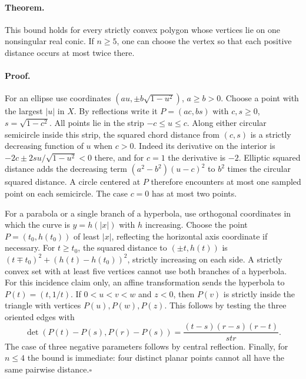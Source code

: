 \documentclass[11pt]{article}
\begin{document}
\paragraph{Theorem.}
This bound holds for every strictly convex polygon whose vertices lie on one nonsingular real conic. If $n\ge5$, one can choose the vertex so that each positive distance occurs at most twice there.
\paragraph{Proof.}
For an ellipse use coordinates $(au,\pm b\sqrt{1-u^2})$, $a\ge b>0$. Choose a point with the largest $|u|$ in $X$. By reflections write it $P=(ac,bs)$ with $c,s\ge0$, $s=\sqrt{1-c^2}$. All points lie in the strip $-c\le u\le c$. Along either circular semicircle inside this strip, the squared chord distance from $(c,s)$ is a strictly decreasing function of $u$ when $c>0$. Indeed its derivative on the interior is $-2c\pm 2su/\sqrt{1-u^2}<0$ there, and for $c=1$ the derivative is $-2$. Elliptic squared distance adds the decreasing term $(a^2-b^2)(u-c)^2$ to $b^2$ times the circular squared distance. A circle centered at $P$ therefore encounters at most one sampled point on each semicircle. The case $c=0$ has at most two points.
  
For a parabola or a single branch of a hyperbola, use orthogonal coordinates in which the curve is $y=h(|x|)$ with $h$ increasing. Choose the point $P=(t_0,h(t_0))$ of least $|x|$, reflecting the horizontal axis coordinate if necessary. For $t\ge t_0$, the squared distance to $(\pm t,h(t))$ is $(t\mp t_0)^2+(h(t)-h(t_0))^2$, strictly increasing on each side.
A strictly convex set with at least five vertices cannot use both branches of a hyperbola. For this incidence claim only, an affine transformation sends the hyperbola to $P(t)=(t,1/t)$. If $0<u<v<w$ and $z<0$, then $P(v)$ is strictly inside the triangle with vertices $P(u),P(w),P(z)$. This follows by testing the three oriented edges with
\[
 \det(P(t)-P(s),P(r)-P(s))
 =\frac{(t-s)(r-s)(r-t)}{str}.
\]
The case of three negative parameters follows by central reflection. Finally, for $n\le4$ the bound is immediate: four distinct planar points cannot all have the same pairwise distance.\hfill$\square$
\end{document}
